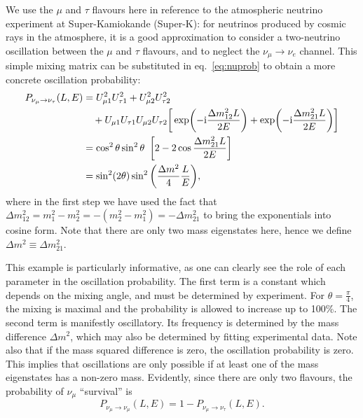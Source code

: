 We use the $\mu$ and $\tau$ flavours here in reference to the
atmospheric neutrino experiment at Super-Kamiokande\cite{superk} (Super-K): for
neutrinos produced by cosmic rays in the atmosphere, it is a good approximation
to consider a two-neutrino oscillation between the $\mu$ and $\tau$ flavours,
and to neglect the $\nu_\mu \rightarrow \nu_e$ channel. 
This simple mixing matrix can be substituted in eq.~\ref{eq:nuprob} to obtain a
more concrete oscillation probability:
\begin{align}
	P_{\nu_\mu \rightarrow \nu_\tau}(L, E) &= U_{\mu 1}^2 U_{\tau 1}^2 + U_{\mu 2}^2
	U_{\tau 2}^2 \nonumber\\&\quad+ U_{\mu 1} U_{\tau 1} U_{\mu 2} U_{\tau 2} \bigg[\exp(-\mathrm{i}
	\frac{\Delta m_{12}^2 L}{2 E}) + \exp(-\mathrm{i} \frac{\Delta m_{21}^2 L}{2
	E})\bigg]\nonumber\\
	&= \cos^2\theta \sin^2\theta\enskip \bigg[2 - 2\cos\frac{\Delta m_{21}^2 L}{2
	E}\bigg]\nonumber\\
	&= \sin^2(2\theta)\sin^2\bigg(\frac{\Delta m^2}{4}
	\frac{L}{E}\bigg),\label{eq:twonu}
\end{align}
where in the first step we have used the fact that $\Delta m_{12}^2 = m_1^2 -
m_2^2=-(m_2^2 - m_1^2) = -\Delta m_{21}^2$ to bring the exponentials into
cosine form.
Note that there are only two mass eigenstates here, hence we define $\Delta m^2
\equiv \Delta m_{21}^2$.

This example is particularly informative, as one can clearly see the role of
each parameter in the oscillation probability. The first term is a constant
which depends on the mixing angle, and must be determined by experiment. For
$\theta = \frac{\pi}{4}$, the mixing is maximal and the probability is allowed
to increase up to 100\%. The second term is manifestly oscillatory. Its
frequency is determined by the mass difference $\Delta m^2$, which may also be
determined by fitting experimental data. Note also that if the mass squared
difference is zero, the oscillation probability is zero. This implies that
oscillations are only possible if at least one of the mass eigenstates has a
non-zero mass.
Evidently, since there are only two flavours, the probability of $\nu_\mu$
``survival'' is
$$P_{\nu_\mu \rightarrow \nu_\mu}(L, E) = 1 - P_{\nu_\mu \rightarrow
\nu_\tau}(L, E).$$



